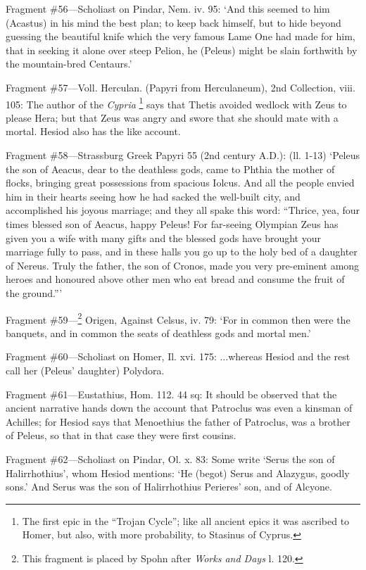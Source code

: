 Fragment \#56—Scholiast on Pindar, Nem. iv. 95: ‘And this seemed to
him (Acastus) in his mind the best plan; to keep back himself, but to hide
beyond guessing the beautiful knife which the very famous Lame One had made for
him, that in seeking it alone over steep Pelion, he (Peleus) might be slain
forthwith by the mountain-bred Centaurs.’

Fragment \#57—Voll. Herculan. (Papyri from Herculaneum), 2nd Collection,
viii. 105: The author of the \emph{Cypria} \footnote{The first epic in the
“Trojan Cycle”; like all ancient epics it was ascribed to Homer,
but also, with more probability, to Stasinus of Cyprus.} says that
Thetis avoided wedlock with Zeus to please Hera; but that Zeus was angry and
swore that she should mate with a mortal. Hesiod also has the like account.

Fragment \#58—Strassburg Greek Papyri 55 (2nd century A.D.): (ll. 1-13)
‘Peleus the son of Aeacus, dear to the deathless gods, came to Phthia the
mother of flocks, bringing great possessions from spacious Iolcus. And all the
people envied him in their hearts seeing how he had sacked the well-built city,
and accomplished his joyous marriage; and they all spake this word:
“Thrice, yea, four times blessed son of Aeacus, happy Peleus! For
far-seeing Olympian Zeus has given you a wife with many gifts and the blessed
gods have brought your marriage fully to pass, and in these halls you go up to
the holy bed of a daughter of Nereus. Truly the father, the son of Cronos, made
you very pre-eminent among heroes and honoured above other men who eat bread
and consume the fruit of the ground.”’

Fragment \#59—\footnote{This fragment is placed by
Spohn after \emph{Works and Days} l. 120.} Origen, Against Celsus, iv. 79:
‘For in common then were the banquets, and in common the seats of
deathless gods and mortal men.’

Fragment \#60—Scholiast on Homer, Il. xvi. 175: ...whereas Hesiod and the
rest call her (Peleus’ daughter) Polydora.

Fragment \#61—Eustathius, Hom. 112. 44 sq: It should be observed that the
ancient narrative hands down the account that Patroclus was even a kinsman of
Achilles; for Hesiod says that Menoethius the father of Patroclus, was a
brother of Peleus, so that in that case they were first cousins.

Fragment \#62—Scholiast on Pindar, Ol. x. 83: Some write ‘Serus the
son of Halirrhothius’, whom Hesiod mentions: ‘He (begot) Serus and
Alazygus, goodly sons.’ And Serus was the son of Halirrhothius
Perieres’ son, and of Alcyone.

